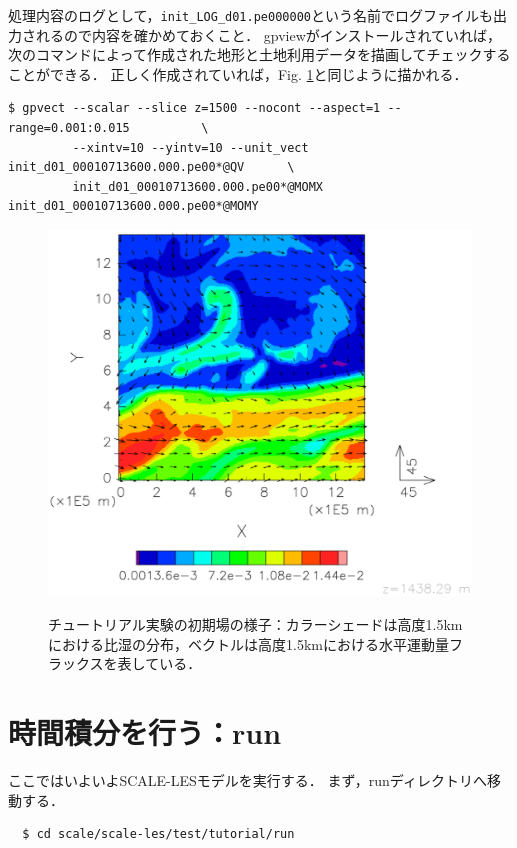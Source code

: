 処理内容のログとして，\verb|init_LOG_d01.pe000000|という名前でログファイルも出力されるので内容を確かめておくこと．
gpviewがインストールされていれば，次のコマンドによって作成された地形と土地利用データを描画してチェックすることができる．
正しく作成されていれば，Fig. \ref{fig:init}と同じように描かれる．

\begin{verbatim}
$ gpvect --scalar --slice z=1500 --nocont --aspect=1 --range=0.001:0.015          \
         --xintv=10 --yintv=10 --unit_vect init_d01_00010713600.000.pe00*@QV      \
         init_d01_00010713600.000.pe00*@MOMX init_d01_00010713600.000.pe00*@MOMY
\end{verbatim}


\begin{figure}[h]
\begin{center}
  \includegraphics[width=0.7\hsize]{./figure/init_qv-momxy.eps}\\
  \caption{チュートリアル実験の初期場の様子：カラーシェードは高度1.5kmにおける比湿の分布，ベクトルは高度1.5kmにおける水平運動量フラックスを表している．}
  \label{fig:init}
\end{center}
\end{figure}


\section{時間積分を行う：run}

ここではいよいよSCALE-LESモデルを実行する．
まず，runディレクトリへ移動する．
\begin{verbatim}
  $ cd scale/scale-les/test/tutorial/run
\end{verbatim}


